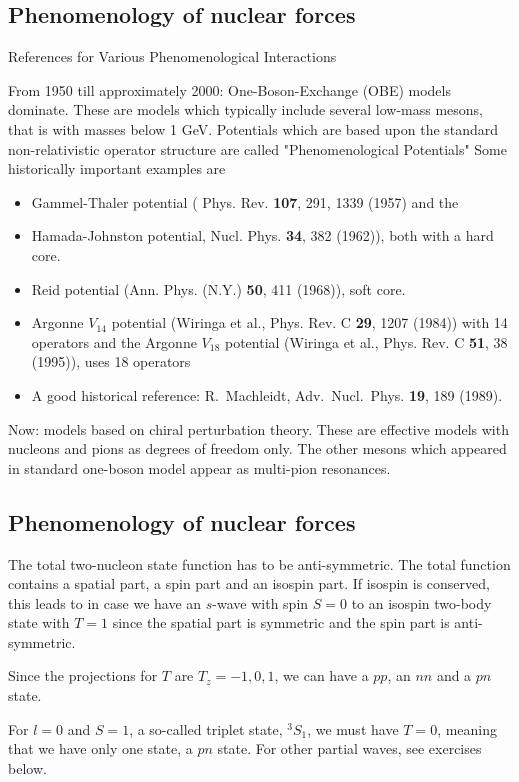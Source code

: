 \documentclass[%
twoside,                 %
final,                   %
10pt]{article}
\begin{document}
\subsection{Phenomenology of nuclear forces}
\begin{block}{References for Various Phenomenological Interactions }

From 1950 till approximately 2000: One-Boson-Exchange (OBE) models dominate. These are models which typically include several low-mass mesons, that is with masses below 1 GeV.   Potentials which are based upon the standard non-relativistic operator structure
 are called "Phenomenological Potentials" Some historically important examples are   
\begin{itemize}
\item Gammel-Thaler potential ( Phys. Rev. \textbf{107}, 291, 1339 (1957) and the 

\item Hamada-Johnston potential, Nucl. Phys. \textbf{34}, 382 (1962)), both with a hard core.

\item Reid potential (Ann. Phys. (N.Y.) \textbf{50}, 411 (1968)), soft core.

\item Argonne $V_{14}$ potential (Wiringa et al., Phys. Rev. C \textbf{29}, 1207 (1984)) with 14 operators and  the  Argonne $V_{18}$ potential (Wiringa et al., Phys. Rev. C \textbf{51}, 38 (1995)), uses 18 operators

\item A good historical reference: R.~Machleidt, Adv.~Nucl.~Phys.  \textbf{19}, 189 (1989).
\end{itemize}

\noindent
Now: models based on chiral perturbation theory. These are effective models with nucleons and pions as degrees of freedom only. The other mesons which appeared in standard one-boson model appear as multi-pion resonances. 


\end{block}




\subsection{Phenomenology of nuclear forces}
\begin{block}{}
The total two-nucleon state function has to be anti-symmetric. The total function contains a spatial part, a spin part and an isospin part. If isospin is conserved, this leads to in case we have an $s$-wave with spin $S=0$ to an isospin 
two-body state with $T=1$ since the spatial part is symmetric and the spin part is anti-symmetric. 

Since the projections for $T$ are $T_z=-1,0,1$, we can have a $pp$, an $nn$ and a $pn$ state.

For $l=0$ and $S=1$, a so-called triplet state, $^3S_1$, we must have $T=0$, meaning that we have only one state, a $pn$ state. For other partial waves, see exercises below. 
\end{block}
\end{document}
